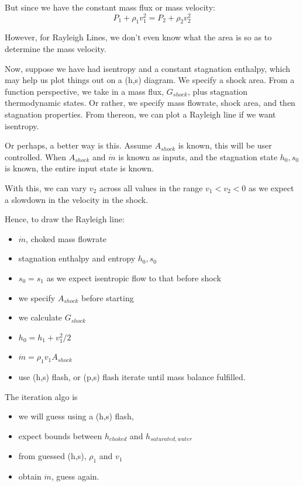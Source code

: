 \documentclass[masters]{ucbthesis}
\renewcommand{\_}{\kern-1.5pt\textunderscore\kern-1.5pt}
\begin{document}
But since we have the constant mass flux or mass velocity:
\begin{equation*}
	P_1 + \rho_1 v_1^2 = P_2  + \rho_2 v_2^2
\end{equation*}

However, for Rayleigh Lines, we don't even know what the area is so as 
to determine the mass velocity.

Now, suppose we have had isentropy and a constant stagnation enthalpy,
which may help us plot things out on a (h,s) diagram. We specify a shock 
area. 
From a function perspective, we take in a mass flux, $G_{shock}$, plus 
stagnation thermodynamic states. Or rather, we specify mass flowrate, 
shock area, and then stagnation properties. From thereon, we can plot a 
Rayleigh line if we want isentropy.

Or perhaps, a better way is this. Assume $A_{shock}$ is known, this will
be user controlled. When $A_{shock}$ and $\dot{m}$ is known as inputs,
and the stagnation state $h_0, s_0$ is known, the entire input state 
is known. 

With this, we can vary $v_2$ across all values in the range 
$v_1 < v_2 < 0$ as we expect a slowdown in the velocity in the shock.

Hence, to draw the Rayleigh line:

\begin{itemize}
	\item $\dot{m}$, choked mass flowrate
	\item stagnation enthalpy and entropy $h_0, s_0$
	\item $s_0 = s_1$ as we expect isentropic flow to that before shock
	\item we specify $A_{shock}$ before starting 
	\item we calculate $G_{shock}$ 
	\item $h_0 = h_1 + v_1^2/2$
	\item $\dot{m} = \rho_1 v_1 A_{shock}$
	\item use (h,s) flash, or (p,s) flash iterate until mass balance fulfilled.
\end{itemize}

The iteration algo is

\begin{itemize}
	\item we will guess using a (h,s) flash, 
	\item expect bounds between $h_{choked}$ and $h_{saturated,water}$
	\item from guessed (h,s), $\rho_1$ and $v_1$
	\item obtain $\dot{m}$, guess again.
\end{itemize}
\end{document}
